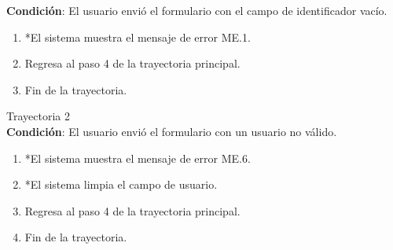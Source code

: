 \textbf{Condición}: El usuario envió el formulario con el campo de identificador vacío.
\begin{enumerate}
    \item *El sistema muestra el mensaje de error ME.1.
    \item Regresa al paso 4 de la trayectoria principal.
    \item Fin de la trayectoria.

\end{enumerate}
\large{Trayectoria 2}\\
\textbf{Condición}: El usuario envió el formulario con un usuario no válido.
\begin{enumerate}
    \item *El sistema muestra el mensaje de error ME.6.
    \item *El sistema limpia el campo de usuario.
    \item Regresa al paso 4 de la trayectoria principal.
    \item Fin de la trayectoria.
\end{enumerate}